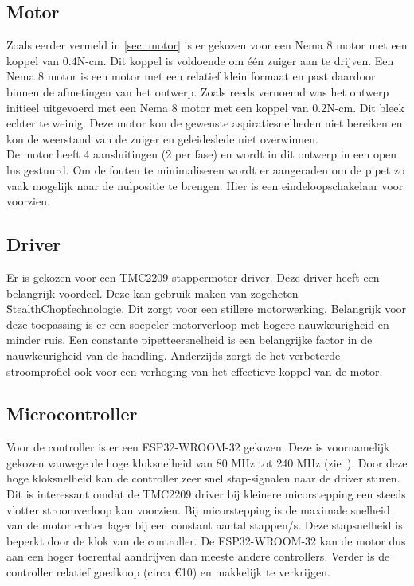 \subsection{Motor}
Zoals eerder vermeld in \autoref{sec: motor} is er gekozen voor een Nema 8 motor met een koppel van 0.4N-cm. Dit koppel is voldoende om één zuiger aan te drijven. Een Nema 8 motor is een motor met een relatief klein formaat en past daardoor binnen de afmetingen van het ontwerp. Zoals reeds vernoemd was het ontwerp initieel uitgevoerd met een Nema 8 motor met een koppel van 0.2N-cm. Dit bleek echter te weinig. Deze motor kon de gewenste aspiratiesnelheden niet bereiken en kon de weerstand van de zuiger en geleideslede niet overwinnen.
\\[12pt]De motor heeft 4 aansluitingen (2 per fase) en wordt in dit ontwerp in een open lus gestuurd. Om de fouten te minimaliseren wordt er aangeraden om de pipet zo vaak mogelijk naar de nulpositie te brengen. Hier is een eindeloopschakelaar voor voorzien.
\subsection{Driver}
Er is gekozen voor een TMC2209 stappermotor driver. Deze driver heeft een belangrijk voordeel. Deze kan gebruik maken van zogeheten \"StealthChop\" technologie. Dit zorgt voor een stillere motorwerking. Belangrijk voor deze toepassing is er een soepeler motorverloop met hogere nauwkeurigheid en minder ruis. Een constante pipetteersnelheid is een belangrijke factor in de nauwkeurigheid van de handling. Anderzijds zorgt de het verbeterde stroomprofiel ook voor een verhoging van het effectieve koppel van de motor.\ \cite{RN45}
\subsection{Microcontroller}
Voor de controller is er een ESP32-WROOM-32 gekozen. Deze is voornamelijk gekozen vanwege de hoge kloksnelheid van 80 MHz tot 240 MHz (zie\ \cite{RN46}). Door deze hoge kloksnelheid kan de controller zeer snel stap-signalen naar de driver sturen. Dit is interessant omdat de TMC2209 driver bij kleinere micorstepping een steeds vlotter stroomverloop kan voorzien. Bij micorstepping is de maximale snelheid van de motor echter lager bij een constant aantal stappen/s. Deze stapsnelheid is beperkt door de klok van de controller. De ESP32-WROOM-32 kan de motor dus aan een hoger toerental aandrijven dan meeste andere controllers. Verder is de controller relatief goedkoop (circa €10) en makkelijk te verkrijgen.
